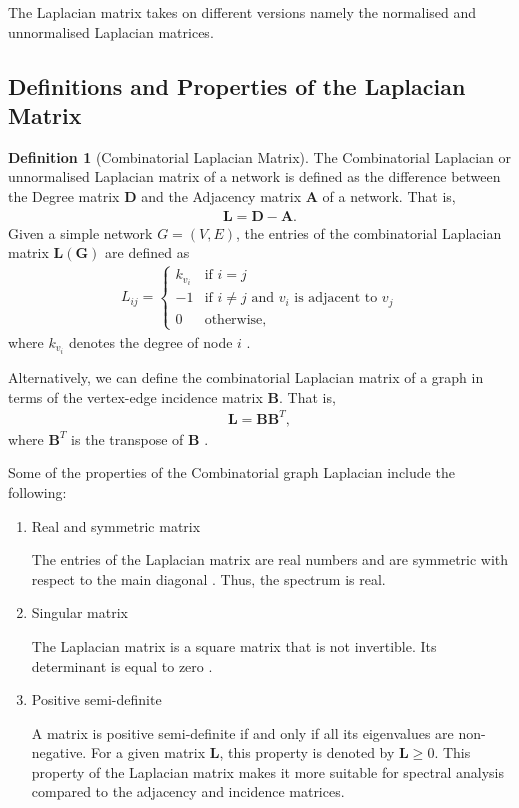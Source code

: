 \documentclass[10pt,a4paper]{article}
\theoremstyle{plain}
\theoremstyle{definition}
\newtheorem{defn}[subsection]{Definition}
\begin{document}
The Laplacian matrix takes on different versions namely the normalised and unnormalised Laplacian matrices.

\subsection{Definitions and Properties of the Laplacian Matrix}

\begin{defn}[Combinatorial Laplacian Matrix]
	The Combinatorial Laplacian or unnormalised Laplacian matrix of a network is defined as the difference between the Degree matrix $\mathbf{D}$ and the Adjacency matrix $\mathbf{A}$ of a network. That is,
	\begin{eqnarray}
	\mathbf{L} = \mathbf{D} - \mathbf{A}.
	\end{eqnarray}
	Given a simple network $G=(V,E)$, the entries of the combinatorial Laplacian matrix $\mathbf{L(G)}$  are defined as
	\begin{eqnarray}
	L_{ij} = \begin{cases} k_{v_i} &\mbox{if } i = j \\
	-1 &\mbox{if } i \neq j \text{ and } v_i \text{ is adjacent to } v_j \\
	0 & \text{otherwise},
	\end{cases}
	\end{eqnarray}
	where $k_{v_i}$  denotes the degree of node $i$ \citep{estrada2011structure}.
	
	Alternatively, we can define the combinatorial Laplacian matrix of a graph in terms of the vertex-edge incidence matrix $\mathbf{B}$. That is,
	\begin{eqnarray}
	\mathbf{L} =  \mathbf{B} \mathbf{B}^T,
	\label{lintermsb}
	\end{eqnarray}
	where $\mathbf{B}^T$ is the transpose of $\mathbf{B}$ \citep{estrada2011structure}.
\end{defn}

Some of the properties of the Combinatorial graph Laplacian  include the following:
\begin{enumerate}	
	\item{Real and symmetric matrix} 
	
	The entries of the Laplacian matrix are real numbers and are symmetric with respect to the main diagonal \citep{das2004laplacian}. Thus, the spectrum is real.
	\item{Singular matrix}
	
	The Laplacian matrix is a square matrix that is not invertible. Its determinant is equal to zero \citep{das2004laplacian}.
	\item{Positive semi-definite}
	
	A matrix is positive semi-definite if and only if all its eigenvalues are non-negative. For a given matrix $\mathbf{L}$, this property is denoted by $\mathbf{L}\geq 0$. This property of the Laplacian matrix makes it more suitable for spectral analysis compared to the adjacency and incidence matrices.
	
\end{enumerate}
\end{document}
